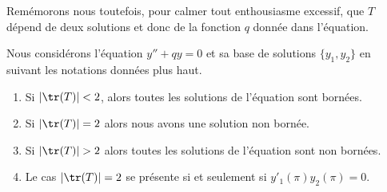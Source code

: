 Remémorons nous toutefois, pour calmer tout enthousiasme excessif, que \( T\) dépend de deux solutions et donc de la fonction \( q\) donnée dans l'équation.

\begin{proposition} \label{PropGJCZcjR}
    Nous considérons l'équation \( y''+qy=0\) et sa base de solutions \( \{ y_1,y_2 \}\) en suivant les notations données plus haut.
    \begin{enumerate}
        \item
            Si \( | \tr(T) |<2\), alors toutes les solutions de l'équation sont bornées.
        \item
            Si \( | \tr(T) |=2\) alors nous avons une solution non bornée.
        \item
            Si \( |\tr(T)|>2\) alors toutes les solutions de l'équation sont non bornées.
        \item
            Le cas \( | \tr(T) |=2\) se présente si et seulement si \( y'_1(\pi)y_2(\pi)=0\).
    \end{enumerate}
\end{proposition}


